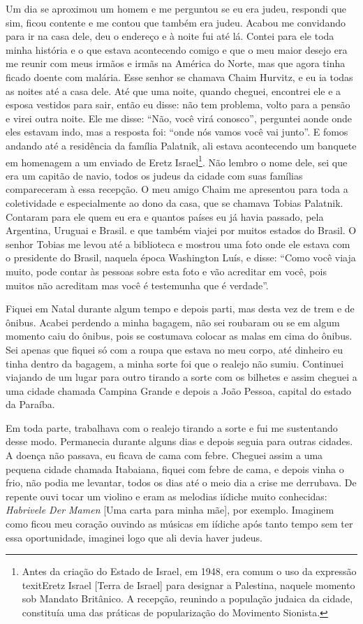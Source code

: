 Um dia se aproximou um homem e me perguntou se eu era judeu, respondi
que sim, ficou contente e me contou que também era judeu. Acabou me
convidando para ir na casa dele, deu o endereço e à noite fui até lá.
Contei para ele toda minha história e o que estava acontecendo comigo e
que o meu maior desejo era me reunir com meus irmãos e irmãs na América
do Norte, mas que agora tinha ficado doente com malária. Esse senhor se
chamava Chaim Hurvitz, e eu ia todas as noites até a casa dele. Até que
uma noite, quando cheguei, encontrei ele e a esposa vestidos para sair,
então eu disse: não tem problema, volto para a pensão e virei outra
noite. Ele me disse: ``Não, você virá conosco'', perguntei aonde onde
eles estavam indo, mas a resposta foi: ``onde nós vamos você vai
junto''. E fomos andando até a residência da família Palatnik, ali
estava acontecendo um banquete em homenagem a um enviado de Eretz
Israel\footnote{Antes da criação do Estado de Israel, em 1948, era comum
  o uso da expressão texit{Eretz Israel} [Terra de Israel] para designar a
  Palestina, naquele momento sob Mandato Britânico. A recepção, reunindo
  a população judaica da cidade, constituía uma das práticas de
  popularização do Movimento Sionista.}. Não lembro o nome dele, sei que
era um capitão de navio, todos os judeus da cidade com suas famílias
compareceram à essa recepção. O meu amigo Chaim me apresentou para toda
a coletividade e especialmente ao dono da casa, que se chamava Tobias
Palatnik. Contaram para ele quem eu era e quantos países eu já havia
passado, pela Argentina, Uruguai e Brasil. e que também viajei por
muitos estados do Brasil. O senhor Tobias me levou até a biblioteca e
mostrou uma foto onde ele estava com o presidente do Brasil, naquela
época Washington Luís, e disse: ``Como você viaja muito, pode contar às
pessoas sobre esta foto e vão acreditar em você, pois muitos não
acreditam mas você é testemunha que é verdade''.

Fiquei em Natal durante algum tempo e depois parti, mas desta vez de
trem e de ônibus. Acabei perdendo a minha bagagem, não sei roubaram ou
se em algum momento caiu do ônibus, pois se costumava colocar as malas
em cima do ônibus. Sei apenas que fiquei só com a roupa que estava no
meu corpo, até dinheiro eu tinha dentro da bagagem, a minha sorte foi
que o realejo não sumiu. Continuei viajando de um lugar para outro
tirando a sorte com os bilhetes e assim cheguei a uma cidade chamada
Campina Grande e depois a João Pessoa, capital do estado da Paraíba.

Em toda parte, trabalhava com o realejo tirando a sorte e fui me
sustentando desse modo. Permanecia durante alguns dias e depois seguia
para outras cidades. A doença não passava, eu ficava de cama com febre.
Cheguei assim a uma pequena cidade chamada Itabaiana, fiquei com febre
de cama, e depois vinha o frio, não podia me levantar, todos os dias até
o meio dia a crise me derrubava. De repente ouvi tocar um violino e eram
as melodias iídiche muito conhecidas: \textit{Habrivele Der Mamen} [Uma carta para minha mãe], 
por exemplo. Imaginem como ficou meu coração
ouvindo as músicas em iídiche após tanto tempo sem ter essa
oportunidade, imaginei logo que ali devia haver judeus.


